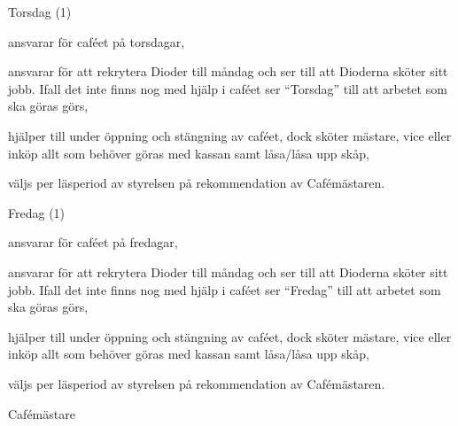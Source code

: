 \documentclass[../_main/handlingar.tex]{subfiles}
\begin{document}
\begin{attsatser}
\begin{tightdashlist}
            \end{tightdashlist}
            Torsdag (1)
              \begin{tightdashlist}
              \item ansvarar för caféet på torsdagar,
              \item ansvarar för att rekrytera Dioder till måndag och ser till att Dioderna sköter sitt jobb. Ifall det inte finns nog med hjälp i caféet ser ``Torsdag''  till att arbetet som ska göras görs,
              \item hjälper till under öppning och stängning av caféet, dock sköter mästare, vice eller inköp allt som behöver göras med kassan samt låsa/låsa upp skåp,
              \item väljs per läsperiod av styrelsen på rekommendation av Cafémästaren.
              \end{tightdashlist}
              Fredag (1)
                \begin{tightdashlist}
                  \item ansvarar för caféet på fredagar,
                  \item ansvarar för att rekrytera Dioder till måndag och ser till att Dioderna sköter sitt jobb. Ifall det inte finns nog med hjälp i caféet ser ``Fredag''  till att arbetet som ska göras görs,
                  \item hjälper till under öppning och stängning av caféet, dock sköter mästare, vice eller inköp allt som behöver göras med kassan samt låsa/låsa upp skåp,
                  \item väljs per läsperiod av styrelsen på rekommendation av Cafémästaren.
                \end{tightdashlist}
\end{attsatser}

\begin{signatures}{1}
    \ist
    \signature{Daniel Bakic}{Cafémästare}
\end{signatures}
\end{document}
